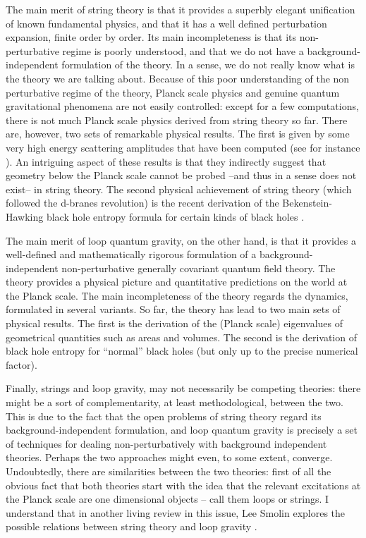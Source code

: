 The main merit of string theory is that it provides a superbly elegant 
unification of known fundamental physics, and that it has a well 
defined perturbation expansion, finite order by order.  Its main 
incompleteness is that its non-perturbative regime is poorly 
understood, and that we do not have a background-independent 
formulation of the theory.  In a sense, we do not really know what is 
the theory we are talking about.  Because of this poor understanding 
of the non perturbative regime of the theory, Planck scale physics and 
genuine quantum gravitational phenomena are not easily controlled: 
except for a few computations, there is not much Planck scale physics 
derived from string theory so far.   There are, however, two sets of 
remarkable physical results.  The first is given by some very high 
energy scattering amplitudes that have been computed (see for instance 
\cite{AmatiVeneziano,AmatiVeneziano2,%
AmatiVeneziano3,AmatiVeneziano4,Verlinde,t'Hooft}).  An intriguing 
aspect of these results is that they indirectly suggest that geometry 
below the Planck scale cannot be probed --and thus in a sense does not 
exist-- in string theory.  The second physical achievement of string 
theory (which followed the d-branes revolution) is the recent 
derivation of the Bekenstein-Hawking black hole entropy formula for 
certain kinds of black holes 
\cite{StromingerVafa,HorowitzStrominger,HorowitzEtAl1,HorowitzEtAl2}.

The main merit of loop quantum gravity, on the other hand, is 
that it provides a well-defined and mathematically rigorous 
formulation of a background-independent non-perturbative 
generally covariant quantum field theory.  The theory provides a 
physical picture and quantitative predictions on the world 
at the Planck scale.  The main incompleteness of the theory 
regards the dynamics, formulated in several variants.  So far, 
the theory has lead to two main sets of physical results.  The 
first is the derivation of the (Planck scale) eigenvalues of 
geometrical quantities such as areas and volumes. The second is
the derivation of black hole entropy for ``normal'' black holes 
(but only up to the precise numerical factor).  

Finally, strings and loop gravity, may not necessarily be competing 
theories: there might be a sort of complementarity, at least 
methodological, between the two.  This is due to the fact that the 
open problems of string theory regard its background-independent 
formulation, and loop quantum gravity is precisely a set of techniques 
for dealing non-perturbatively with background independent theories.  
Perhaps the two approaches might even, to some extent, converge.  
Undoubtedly, there are similarities between the two theories: first of 
all the obvious fact that both theories start with the idea that the 
relevant excitations at the Planck scale are one dimensional objects 
-- call them loops or strings.  I understand that in another living 
review in this issue, Lee Smolin explores the possible relations 
between string theory and loop gravity \cite{Smolin97}.

